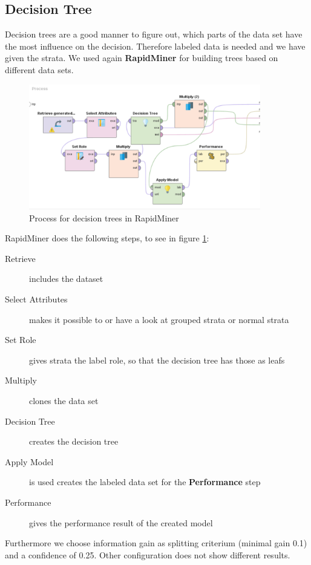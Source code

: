 \setlength{\parindent}{0em}
\subsection{Decision Tree} \label{subsec: decisiontree}
Decision trees are a good manner to figure out, which parts of the data set have the most influence on the decision. Therefore labeled data is needed and we have given the strata. We used again \textbf{RapidMiner} for building trees based on different data sets. 

\begin{figure}[!htbp]
\centering
\includegraphics[width = 0.9\textwidth]{DecisionTreeRapidModel.PNG}
\caption{Process for decision trees in RapidMiner}
\label{fig: RapDec}
\end{figure}

RapidMiner does the following steps, to see in figure \ref{fig: RapDec}:
\begin{description}
	\item[Retrieve] includes the dataset
	\item[Select Attributes] makes it possible to or have a look at grouped strata or normal strata
	\item[Set Role] gives strata the label role, so that the decision tree has those as leafs
	\item[Multiply] clones the data set 
	\item[Decision Tree] creates the decision tree
	\item[Apply Model] is used creates the labeled data set for the \textbf{Performance} step
	\item[Performance] gives the performance result of the created model
\end{description}

Furthermore we choose information gain as splitting criterium (minimal gain 0.1) and a confidence of 0.25. Other configuration does not show different results.

